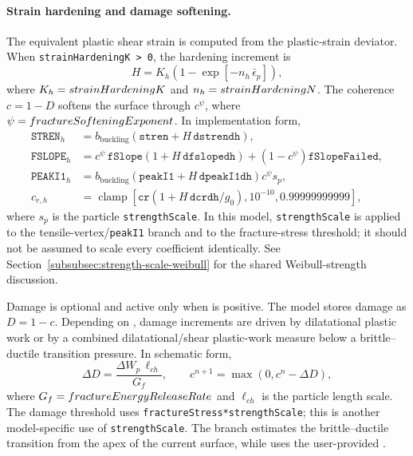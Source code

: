 \paragraph{Strain hardening and damage softening.}
The equivalent plastic shear strain is computed from the plastic-strain deviator.  When \texttt{strainHardeningK > 0}, the hardening increment is
\begin{equation}
  H = K_h\left(1-\exp[-n_h\,\bar\epsilon_p]\right),
  \label{eq:geomechanics-hardening}
\end{equation}
where \(K_h=strainHardeningK\) and \(n_h=strainHardeningN\).  The coherence \(c=1-D\) softens the surface through \(c^\psi\), where \(\psi=fractureSofteningExponent\).  In implementation form,
\begin{align}
  \texttt{STREN}_h &= b_{\mathrm{buckling}}\left(\texttt{stren}+H\,\texttt{dstrendh}\right),\\
  \texttt{FSLOPE}_h &= c^\psi\,\texttt{fSlope}\left(1+H\,\texttt{dfslopedh}\right)
  +\left(1-c^\psi\right)\texttt{fSlopeFailed},\\
  \texttt{PEAKI1}_h &= b_{\mathrm{buckling}}\left(\texttt{peakI1}+H\,\texttt{dpeakI1dh}\right)c^\psi s_p,\\
  c_{r,h} &= \operatorname{clamp}\left[\texttt{cr}\left(1+H\,\texttt{dcrdh}/g_0\right),10^{-10},0.99999999999\right],
  \label{eq:geomechanics-hardening-parameters}
\end{align}
where \(s_p\) is the particle \texttt{strengthScale}.  In this model, \texttt{strengthScale} is applied to the tensile-vertex/\texttt{peakI1} branch and to the fracture-stress threshold; it should not be assumed to scale every coefficient identically.  See Section~\ref{subsubsec:strength-scale-weibull} for the shared Weibull-strength discussion.

Damage is optional and active only when  is positive.  The model stores damage as \(D=1-c\).  Depending on , damage increments are driven by dilatational plastic work or by a combined dilatational/shear plastic-work measure below a brittle--ductile transition pressure.  In schematic form,
\begin{equation}
  \Delta D = \frac{\Delta W_p\,\ell_{ch}}{G_f}, \qquad
  c^{n+1}=\max(0,c^n-\Delta D),
  \label{eq:geomechanics-damage}
\end{equation}
where \(G_f=fractureEnergyReleaseRate\) and \(\ell_{ch}\) is the particle length scale.  The damage threshold uses \texttt{fractureStress*strengthScale}; this is another model-specific use of \texttt{strengthScale}.  The  branch estimates the brittle--ductile transition from the apex of the current surface, while  uses the user-provided .

